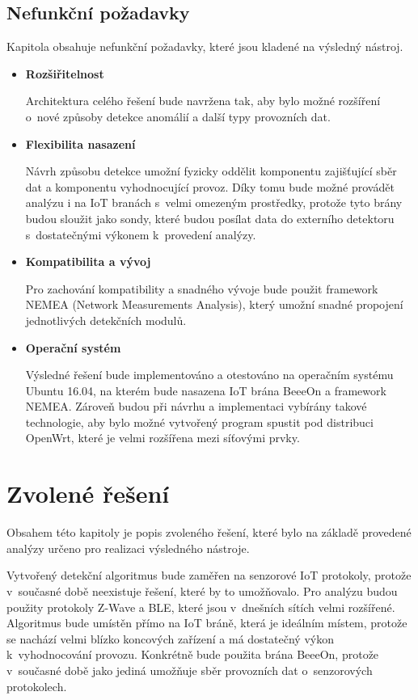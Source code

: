   \subsection{Nefunkční požadavky}
  Kapitola obsahuje nefunkční požadavky, které jsou kladené na výsledný nástroj.
  \begin{itemize}
   \item \textbf{Rozšiřitelnost}
   
   Architektura celého řešení bude navržena tak, aby bylo možné rozšíření o~nové 
   způsoby detekce anomálií a další typy provozních dat.
   
   \item \textbf{Flexibilita nasazení}
   
   Návrh způsobu detekce umožní fyzicky oddělit komponentu zajišťující sběr dat a komponentu vyhodnocující 
   provoz. Díky tomu bude možné provádět analýzu i na IoT branách s~velmi omezeným prostředky, protože 
   tyto brány budou sloužit jako sondy, které budou posílat data do externího detektoru s~dostatečnými 
   výkonem k~provedení analýzy. 
   
   \item \textbf{Kompatibilita a vývoj}
   
   Pro zachování kompatibility a snadného vývoje bude použit framework NEMEA
    \cite{nemea} (Network Measurements Analysis), který umožní snadné propojení 
    jednotlivých detekčních modulů.
   
   \item \textbf{Operační systém}
   
   Výsledné řešení bude implementováno a otestováno na operačním systému Ubuntu 16.04, na kterém 
   bude nasazena IoT brána BeeeOn a framework NEMEA. Zároveň
   budou při návrhu a implementaci vybírány takové technologie, aby bylo možné vytvořený program
   spustit pod distribuci OpenWrt, které je velmi rozšířena mezi síťovými prvky.   
   
  \end{itemize}

 \newpage 
 \section{Zvolené řešení}
 Obsahem této kapitoly je popis zvoleného řešení, které bylo na základě provedené analýzy
 určeno pro realizaci výsledného nástroje.
 
 Vytvořený detekční algoritmus bude zaměřen na senzorové IoT protokoly, protože v~současné době 
 neexistuje řešení, které by to umožňovalo. Pro analýzu budou použity protokoly Z-Wave a BLE, 
 které jsou v~dnešních sítích velmi rozšířené. Algoritmus bude umístěn přímo na IoT bráně, která 
 je ideálním místem, protože
 se nachází velmi blízko koncových zařízení a má dostatečný výkon k~vyhodnocování provozu. 
 Konkrétně bude použita brána BeeeOn, protože v~současné době 
 jako jediná umožňuje sběr provozních dat o~senzorových protokolech. 
 
